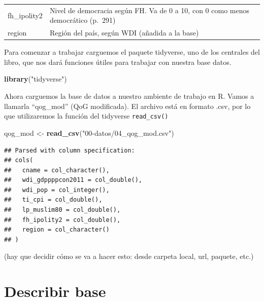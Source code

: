\documentclass[]{book}
\newenvironment{Shaded}{\begin{snugshade}}{\end{snugshade}}
\newcommand{\KeywordTok}[1]{\textcolor[rgb]{0.13,0.29,0.53}{\textbf{#1}}}
\newcommand{\StringTok}[1]{\textcolor[rgb]{0.31,0.60,0.02}{#1}}
\newcommand{\NormalTok}[1]{#1}
\begin{document}
\begin{longtable}[]{@{}ll@{}}
\begin{minipage}[t]{0.16\columnwidth}
fh\_ipolity2\strut
\end{minipage} & \begin{minipage}[t]{0.78\columnwidth}\raggedright\strut
Nivel de democracia según FH. Va de 0 a 10, con 0 como menos democrático
(p.~291)\strut
\end{minipage}\tabularnewline
\begin{minipage}[t]{0.16\columnwidth}\raggedright\strut
region\strut
\end{minipage} & \begin{minipage}[t]{0.78\columnwidth}\raggedright\strut
Región del país, según WDI (añadida a la base)\strut
\end{minipage}\tabularnewline
\bottomrule
\end{longtable}

Para comenzar a trabajar carguemos el paquete tidyverse, uno de los
centrales del libro, que nos dará funciones útiles para trabajar con
nuestra base datos.

\begin{Shaded}
\begin{Highlighting}[]
\KeywordTok{library}\NormalTok{(}\StringTok{"tidyverse"}\NormalTok{)}
\end{Highlighting}
\end{Shaded}

Ahora carguemos la base de datos a nuestro ambiente de trabajo en R.
Vamos a llamarla ``qog\_mod'' (QoG modificada). El archivo está en
formato .csv, por lo que utilizaremos la función del tidyverse
\texttt{read\_csv()}

\begin{Shaded}
\begin{Highlighting}[]
\NormalTok{qog_mod <-}\StringTok{ }\KeywordTok{read_csv}\NormalTok{(}\StringTok{"00-datos/04_qog_mod.csv"}\NormalTok{)}
\end{Highlighting}
\end{Shaded}

\begin{verbatim}
## Parsed with column specification:
## cols(
##   cname = col_character(),
##   wdi_gdppppcon2011 = col_double(),
##   wdi_pop = col_integer(),
##   ti_cpi = col_double(),
##   lp_muslim80 = col_double(),
##   fh_ipolity2 = col_double(),
##   region = col_character()
## )
\end{verbatim}

(hay que decidir cómo se va a hacer esto: desde carpeta local, url,
paquete, etc.)

\section{Describir base}\label{describir-base}
\end{document}
